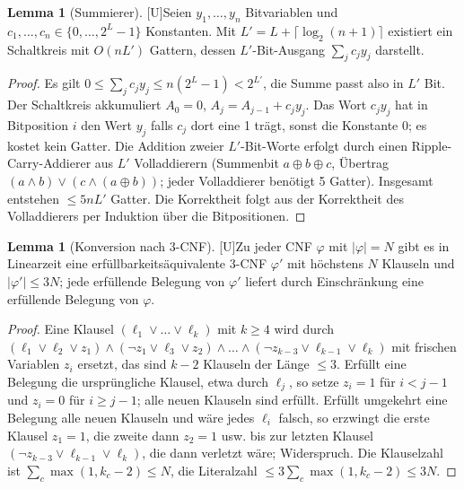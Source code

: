 \documentclass[a4paper,12pt]{article}
\theoremstyle{definition}
\newtheorem{lemma}[definition]{Lemma}
\newcommand{\tU}{\textsf{\small[U]}}   %
\begin{document}
\begin{lemma}[Summierer]\tU\label{lem:sum}
Seien \(y_1,\dots,y_n\) Bitvariablen und \(c_1,\dots,c_n\in\{0,\dots,2^L-1\}\) Konstanten. Mit \(L'=L+\lceil\log_2(n+1)\rceil\) existiert ein Schaltkreis mit \(O(n L')\) Gattern, dessen \(L'\)-Bit-Ausgang \(\sum_j c_j y_j\) darstellt.
\end{lemma}
\begin{proof}
Es gilt \(0\le\sum_j c_jy_j\le n(2^L-1)<2^{L'}\), die Summe passt also in \(L'\) Bit. Der Schaltkreis akkumuliert \(A_0=0\), \(A_j=A_{j-1}+c_jy_j\). Das Wort \(c_jy_j\) hat in Bitposition \(i\) den Wert \(y_j\) falls \(c_j\) dort eine 1 trägt, sonst die Konstante 0; es kostet kein Gatter. Die Addition zweier \(L'\)-Bit-Worte erfolgt durch einen Ripple-Carry-Addierer aus \(L'\) Volladdierern (Summenbit \(a\oplus b\oplus c\), Übertrag \((a\wedge b)\vee(c\wedge(a\oplus b))\); jeder Volladdierer benötigt 5 Gatter). Insgesamt entstehen \(\le 5nL'\) Gatter. Die Korrektheit folgt aus der Korrektheit des Volladdierers per Induktion über die Bitpositionen.
\end{proof}

\begin{lemma}[Konversion nach 3-CNF]\tU\label{lem:3cnf}
Zu jeder CNF \(\varphi\) mit \(|\varphi|=N\) gibt es in Linearzeit eine erfüllbarkeitsäquivalente 3-CNF \(\varphi'\) mit höchstens \(N\) Klauseln und \(|\varphi'|\le 3N\); jede erfüllende Belegung von \(\varphi'\) liefert durch Einschränkung eine erfüllende Belegung von \(\varphi\).
\end{lemma}
\begin{proof}
Eine Klausel \((\ell_1\vee\dots\vee\ell_k)\) mit \(k\ge4\) wird durch \((\ell_1\vee\ell_2\vee z_1)\wedge(\neg z_1\vee\ell_3\vee z_2)\wedge\dots\wedge(\neg z_{k-3}\vee\ell_{k-1}\vee\ell_k)\) mit frischen Variablen \(z_i\) ersetzt, das sind \(k-2\) Klauseln der Länge \(\le3\). Erfüllt eine Belegung die ursprüngliche Klausel, etwa durch \(\ell_j\), so setze \(z_i=1\) für \(i<j-1\) und \(z_i=0\) für \(i\ge j-1\); alle neuen Klauseln sind erfüllt. Erfüllt umgekehrt eine Belegung alle neuen Klauseln und wäre jedes \(\ell_i\) falsch, so erzwingt die erste Klausel \(z_1=1\), die zweite dann \(z_2=1\) usw. bis zur letzten Klausel \((\neg z_{k-3}\vee\ell_{k-1}\vee\ell_k)\), die dann verletzt wäre; Widerspruch. Die Klauselzahl ist \(\sum_c\max(1,k_c-2)\le N\), die Literalzahl \(\le 3\sum_c\max(1,k_c-2)\le 3N\).
\end{proof}
\end{document}
